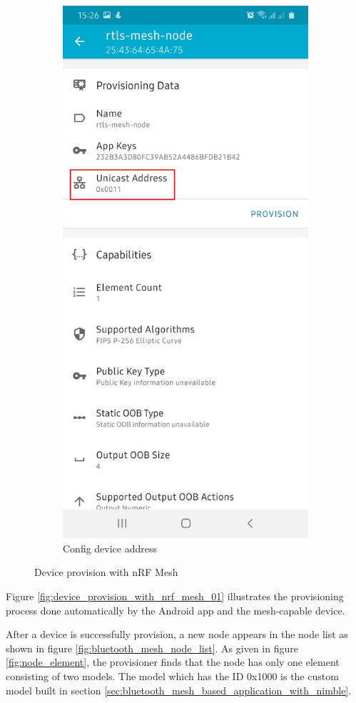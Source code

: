 \documentclass[\main/main.tex]{subfiles}
\begin{document}
\begin{figure}[H]
\begin{subfigure}[b]{0.4\linewidth}
        \includegraphics[width=0.7\linewidth]{nRF_Mesh_01.jpg}
        \caption{Config device address}
        \label{fig:config_device_address}
    \end{subfigure}
    \caption{Device provision with nRF Mesh}
    \label{fig:device_provision_with_nrf_mesh_00}
\end{figure}

Figure \ref{fig:device_provision_with_nrf_mesh_01} illustrates the provisioning process done automatically by the Android app and the mesh-capable device.

After a device is successfully provision, a new node appears in the node list as shown in figure \ref{fig:bluetooth_mesh_node_list}. As given in figure \ref{fig:node_element}, the provisioner finds that the node has only one element consisting of two models. The model which has the ID 0x1000 is the custom model built in section \ref{sec:bluetooth_mesh_based_application_with_nimble}. 
\end{document}
